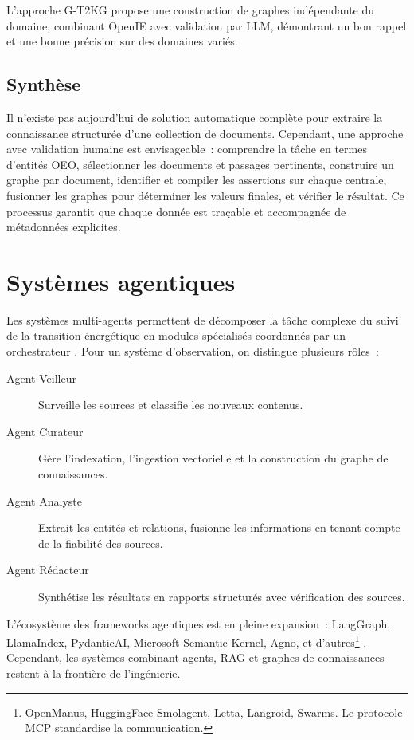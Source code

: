 \documentclass[a4paper,11pt]{report}
\begin{document}
L'approche G-T2KG \citep{A8YXRKGQ} propose une construction de graphes indépendante du domaine, combinant OpenIE avec validation par LLM, démontrant un bon rappel et une bonne précision sur des domaines variés.

\section{Synthèse}

Il n'existe pas aujourd'hui de solution automatique complète pour extraire la connaissance structurée d'une collection de documents. Cependant, une approche avec validation humaine est envisageable~: comprendre la tâche en termes d'entités OEO, sélectionner les documents et passages pertinents, construire un graphe par document, identifier et compiler les assertions sur chaque centrale, fusionner les graphes pour déterminer les valeurs finales, et vérifier le résultat. Ce processus garantit que chaque donnée est traçable et accompagnée de métadonnées explicites.

\chapter{Systèmes agentiques}\label{chap:agents}

Les systèmes multi-agents permettent de décomposer la tâche complexe du suivi de la transition énergétique en modules spécialisés coordonnés par un orchestrateur \citep{W45HUZN5,MW2ME5P3}. Pour un système d'observation, on distingue plusieurs rôles~:

\begin{description}
\item[Agent Veilleur] Surveille les sources et classifie les nouveaux contenus.
\item[Agent Curateur] Gère l'indexation, l'ingestion vectorielle et la construction du graphe de connaissances.
\item[Agent Analyste] Extrait les entités et relations, fusionne les informations en tenant compte de la fiabilité des sources.
\item[Agent Rédacteur] Synthétise les résultats en rapports structurés avec vérification des sources.
\end{description}

L'écosystème des frameworks agentiques est en pleine expansion~: LangGraph, LlamaIndex, PydanticAI, Microsoft Semantic Kernel, Agno, et d'autres\footnote{OpenManus, HuggingFace Smolagent, Letta, Langroid, Swarms. Le protocole MCP standardise la communication.} \citep{ZF27JTIS,CVBHDNL3,LKNBDMMK}. Cependant, les systèmes combinant agents, RAG et graphes de connaissances restent à la frontière de l'ingénierie.
\end{document}
